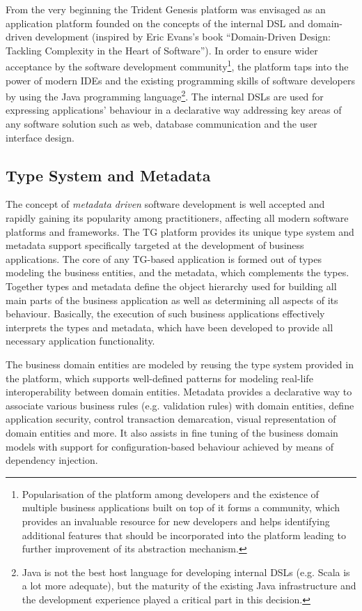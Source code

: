   From the very beginning the Trident Genesis platform was envisaged as an application platform founded on the concepts of the internal DSL and domain-driven development (inspired by Eric Evans's book ``Domain-Driven Design: Tackling Complexity in the Heart of Software'').
  In order to ensure wider acceptance by the software development community\footnote{Popularisation of the platform among developers and the existence of multiple business applications built on top of it forms a community, which provides an invaluable resource for new developers and helps identifying additional features that should be incorporated into the platform leading to further improvement of its abstraction mechanism.}, the platform taps into the power of modern IDEs and the existing programming skills of software developers by using the Java programming language\footnote{Java is not the best host language for developing internal DSLs (e.g. Scala is a lot more adequate), but the maturity of the existing Java infrastructure and the development experience played a critical part in this decision.}.
  The internal DSLs are used for expressing applications' behaviour in a declarative way addressing key areas of any software solution such as web, database communication and the user interface design.

\subsection{Type System and Metadata}
  The concept of \emph{metadata driven} software development is well accepted and rapidly gaining its popularity among practitioners, affecting all modern software platforms and frameworks.
  The TG platform provides its unique type system and metadata support specifically targeted at the development of business applications.
  The core of any TG-based application is formed out of types modeling the business entities, and the metadata, which complements the types.
  Together types and metadata define the object hierarchy used for building all main parts of the business application as well as determining all aspects of its behaviour.
  Basically, the execution of such business applications effectively interprets the types and metadata, which have been developed to provide all necessary application functionality.

  The business domain entities are modeled by reusing the type system provided in the platform, which supports well-defined patterns for modeling real-life interoperability between domain entities.  
  Metadata provides a declarative way to associate various business rules (e.g. validation rules) with domain entities, define application security, control transaction demarcation, visual representation of domain entities and more.
  It also assists in fine tuning of the business domain models with support for configuration-based behaviour achieved by means of dependency injection.
  

